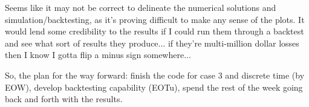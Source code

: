 \documentclass[12pt]{article}
\begin{document}
Seems like it may not be correct to delineate the numerical solutions and simulation/backtesting, as it's proving difficult to make any sense of the plots. It would lend some credibility to the results if I could run them through a backtest and see what sort of results they produce... if they're multi-million dollar losses then I know I gotta flip a minus sign somewhere...

So, the plan for the way forward: finish the code for case 3 and discrete time (by EOW), develop backtesting capability (EOTu), spend the rest of the week going back and forth with the results. 
\end{document}
